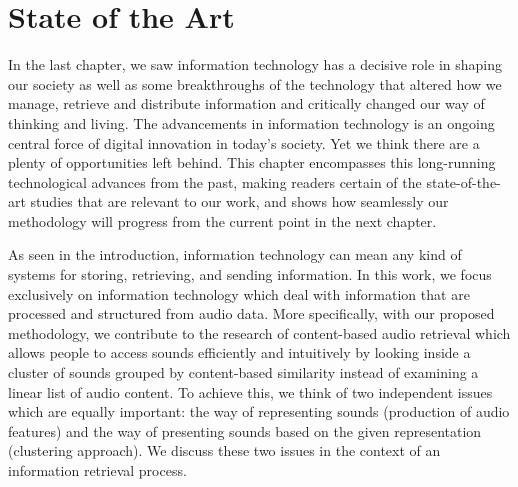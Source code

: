 \normallinespacing

\chapter{State of the Art}

In the last chapter, we saw information technology has a decisive role in shaping our society as well as some breakthroughs of the technology that altered how we manage, retrieve and distribute information and critically changed our way of thinking and living. The advancements in information technology is an ongoing central force of digital innovation in today's society. Yet we think there are a plenty of opportunities left behind. This chapter encompasses this long-running technological advances from the past, making readers certain of the state-of-the-art studies that are relevant to our work, and shows how seamlessly our methodology will progress from the current point in the next chapter. 

As seen in the introduction, information technology can mean any kind of systems for storing, retrieving, and sending information. In this work, we focus exclusively on information technology which deal with information that are processed and structured from audio data. 
More specifically, with our proposed methodology, we contribute to the research of content-based audio retrieval which allows people to access sounds efficiently and intuitively by looking inside a cluster of sounds grouped by content-based similarity instead of examining a linear list of audio content.
To achieve this, we think of two independent issues which are equally important: the way of representing sounds (production of audio features) and the way of presenting sounds based on the given representation (clustering approach). We discuss these two issues in the context of an information retrieval process.%


